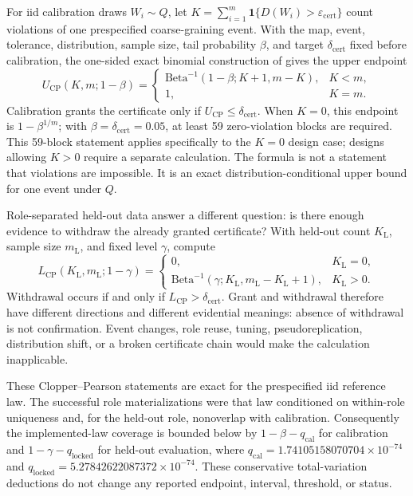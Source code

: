\documentclass[10pt]{article}
\theoremstyle{definition}
\begin{document}
For iid calibration draws \(W_i\sim Q\), let
\(K=\sum_{i=1}^m\mathbf1\{D(W_i)>\varepsilon_{\mathrm{cert}}\}\) count violations of one prespecified
coarse-graining event. With the map, event, tolerance, distribution, sample size, tail probability
\(\beta\), and target \(\delta_{\mathrm{cert}}\) fixed before calibration, the one-sided exact binomial construction
of \citet{clopper1934} gives the upper endpoint
\begin{equation}
U_{\mathrm{CP}}(K,m;1-\beta)=
\begin{cases}
\mathrm{Beta}^{-1}(1-\beta;K+1,m-K),&K<m,\\
1,&K=m.
\end{cases}
\label{eq:cp}
\end{equation}
Calibration grants the certificate only if \(U_{\mathrm{CP}}\le\delta_{\mathrm{cert}}\). When
\(K=0\), this endpoint is \(1-\beta^{1/m}\); with \(\beta=\delta_{\mathrm{cert}}=0.05\), at least 59
zero-violation blocks are required. This 59-block statement applies specifically to the
\(K=0\) design case; designs allowing \(K>0\) require a separate calculation. The formula is not a statement that violations are
impossible. It is an exact distribution-conditional upper bound for one event under \(Q\).

Role-separated held-out data answer a different question: is there enough evidence to withdraw the
already granted certificate? With held-out count \(K_{\mathrm L}\), sample size
\(m_{\mathrm L}\), and fixed level \(\gamma\), compute
\begin{equation}
L_{\mathrm{CP}}(K_{\mathrm L},m_{\mathrm L};1-\gamma)=
\begin{cases}
0,&K_{\mathrm L}=0,\\
\mathrm{Beta}^{-1}(\gamma;K_{\mathrm L},m_{\mathrm L}-K_{\mathrm L}+1),
&K_{\mathrm L}>0.
\end{cases}
\label{eq:cp-audit}
\end{equation}
Withdrawal occurs if and only if \(L_{\mathrm{CP}}>\delta_{\mathrm{cert}}\). Grant and withdrawal therefore
have different directions and different evidential meanings: absence of withdrawal is not
confirmation. Event changes, role reuse, tuning, pseudoreplication, distribution shift, or a broken
certificate chain would make the calculation inapplicable.

These Clopper--Pearson statements are exact for the prespecified iid reference law. The successful
role materializations were that law conditioned on within-role uniqueness and, for the held-out
role, nonoverlap with calibration. Consequently the implemented-law coverage is bounded below by
\(1-\beta-q_{\mathrm{cal}}\) for calibration and
\(1-\gamma-q_{\mathrm{locked}}\) for held-out evaluation, where
\(q_{\mathrm{cal}}=1.74105158070704\times10^{-74}\) and
\(q_{\mathrm{locked}}=5.27842622087372\times10^{-74}\). These conservative total-variation
deductions do not change any reported endpoint, interval, threshold, or status.
\end{document}
